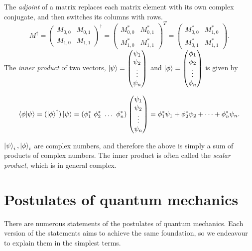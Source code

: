 The \textit{adjoint} of a matrix replaces each matrix element with its own complex conjugate, and then switches its columns with rows.
    \begin{equation}
    M^{\dag} = \begin{pmatrix}
    M_{0,0} & M_{0,1} \\ M_{1,0} & M_{1,1} \end{pmatrix}  ^{\dag} = 
    \begin{pmatrix}
    M_{0,0}^* & M_{0,1}^* \\ M_{1,0}^* & M_{1,1}^* \end{pmatrix} ^T = 
    \begin{pmatrix}
    M_{0,0}^* & M_{1,0}^* \\ M_{0,1}^* & M_{1,1}^* \end{pmatrix}.
    \end{equation}
The \textit{inner product} of two vectors, $\ket{\psi} = \left(\begin{matrix}\psi_1 \\ \psi_2 \\ \vdots \\ \psi_n\end{matrix}\right)$ and $\ket{\phi}= \left(\begin{matrix}\phi_1 \\ \phi_2 \\ \vdots \\ \phi_n \end{matrix}\right)$ is given by 

    \begin{equation}
    \braket{\phi | \psi} = (\ket{\phi}^{\dag})\ket{\psi}
    = (\phi_1^* \ \phi_2^* \ \hdots \ \phi_n^*) \left(\begin{matrix}\psi_1 \\ \psi_2 \\ \vdots \\ \psi_n\end{matrix}\right)
    = \phi_1^* \psi_1 + \phi_2^* \psi_2 + \dots + \phi_n^* \psi_n.
    \end{equation}

$\ket{\psi}_i, \ket{\phi}_i$ are complex numbers, and therefore the above is simply a sum of products of complex numbers. 
The inner product is often called the \emph{scalar product}, which is in general complex.

\section{Postulates of quantum mechanics}\label{sec:postulates}

There are numerous statements of the postulates of quantum mechanics. 
Each version of the statements aims to achieve the same foundation, so we endeavour to explain them in the simplest terms. 

